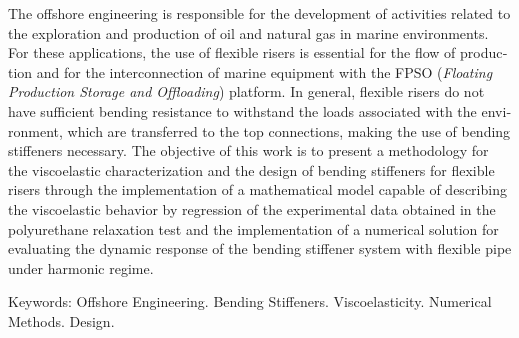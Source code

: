 \documentclass[arial,centeredequations,english,brazilian,oneside,section=TITLE]{ifes8}
\begin{document}
\begin{resumo}[Abstract]
  \begin{otherlanguage}{english}
    The offshore engineering is responsible for the development of activities related to the exploration and 
    production of oil and natural gas in marine environments. For these applications, the use of flexible 
    risers is essential for the flow of production and for the interconnection of marine equipment with the 
    FPSO (\emph{Floating Production Storage and Offloading}) platform. In general, flexible risers do not 
    have sufficient bending resistance to withstand the loads associated with the environment, which are transferred 
    to the top connections, making the use of bending stiffeners necessary. The objective of this work is to 
    present a methodology for the viscoelastic characterization and the design of bending stiffeners for flexible 
    risers through the implementation of a mathematical model capable of describing the viscoelastic behavior by 
    regression of the experimental data obtained in the polyurethane relaxation test and the implementation of a 
    numerical solution for evaluating the dynamic response of the bending stiffener system with flexible pipe under 
    harmonic regime.

    Keywords: Offshore Engineering. Bending Stiffeners. Viscoelasticity. Numerical Methods. Design.
  \end{otherlanguage}
\end{resumo}










\end{document}
